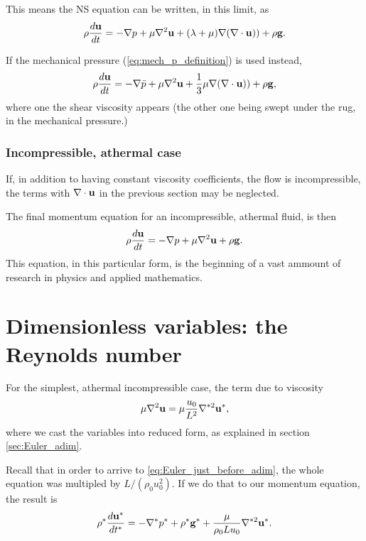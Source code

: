 This means the NS equation can be written, in this limit,
as
\begin{equation}
  \label{eq:NS_const_viscs}
  \rho \frac{d\mathbf{u} }{dt} =
  - \nabla p +
   \mu \nabla^2  \mathbf{u}
  + ( \lambda  + \mu) \nabla ( \nabla\cdot\mathbf{u} ) )
  + \rho \mathbf{g} .
\end{equation}



If the mechanical pressure (\ref{eq:mech_p_definition}) is used instead,
\begin{equation}
  \label{eq:NS_const_viscs_mech_press}
  \rho \frac{d\mathbf{u} }{dt} =
  - \nabla \bar{p} +
  \mu \nabla^2  \mathbf{u}
  + \frac13  \mu \nabla ( \nabla\cdot\mathbf{u} ) )
  + \rho \mathbf{g} ,
\end{equation}
where one the shear viscosity appears (the other one being swept under
the rug, in the mechanical pressure.)


\subsubsection{Incompressible, athermal case}

If, in addition to having constant viscosity coefficients, the flow is
incompressible, the terms with $\nabla\cdot\mathbf{u}$ in the previous section may be
neglected.

The final momentum equation for an incompressible, athermal fluid, is
then
\begin{equation}
  \label{eq:NS_usual}
  \rho \frac{d\mathbf{u} }{dt} =
  - \nabla p 
  + \mu \nabla^2 \mathbf{u}
  + \rho \mathbf{g} .
\end{equation}
This equation, in this particular form, is the beginning of a vast
ammount of research in physics and applied mathematics.





\section{Dimensionless variables: the Reynolds number}

For the simplest, athermal incompressible case, the term due to
viscosity
\[
\mu \nabla^2 \mathbf{u} = \mu \frac{u_0}{L^2} \nabla^{*2} \mathbf{u}^* ,
\]
where we cast the variables into reduced form, as explained in
section \ref{sec:Euler_adim}.

Recall that in order to arrive to \ref{eq:Euler_just_before_adim}, the
whole equation was multipled by $L/(\rho_0 u_0^2)$. If we do that to our
momentum equation, the result is
\[
\rho^* \frac{d\mathbf{u}^* }{dt^* } =
-  \nabla^* p^*
+  \rho^* \mathbf{g}^* +
\frac{\mu }{\rho_ 0 L u_0 } \nabla^{*2} \mathbf{u}^* .
\]

